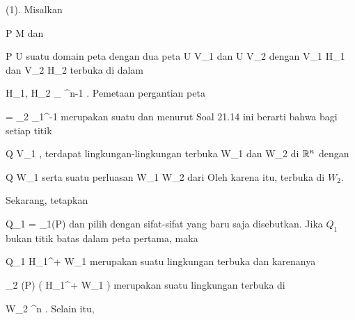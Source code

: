 {

\teilbeweis {}{}{}
{(1). Misalkan

\mavergleichskette
{\vergleichskette
{ P
}
{ \in }{ M
}
{  }{
}
{    }{
}
{   }{
}
}
{}{}{}
dan

\mavergleichskette
{\vergleichskette
{ P
}
{ \in }{ U
}
{  }{
}
{    }{
}
{   }{
}
}
{}{}{}
suatu domain peta dengan dua peta
 { U } { V_1
} {}
dan
 { U } { V_2
} {}
dengan
\mathkor {} {V_1 \subseteq H_1} {dan} {V_2 \subseteq H_2} {}
terbuka di dalam

\mavergleichskette
{\vergleichskette
{ H_1, H_2
}
{ \cong }{ \R_{} \times \R^{n-1}
}
{  }{
}
{    }{
}
{   }{
}
}
{}{}{.}
Pemetaan pergantian peta

\mavergleichskette
{\vergleichskette
{ \varphi
}
{ = }{ \alpha_2 \circ \alpha_1^{-1}
}
{  }{
}
{    }{
}
{   }{
}
}
{}{}{}
merupakan suatu
dan menurut Soal 21.14 ini berarti bahwa bagi setiap titik

\mavergleichskette
{\vergleichskette
{ Q
}
{ \in }{ V_1
}
{  }{
}
{    }{
}
{   }{
}
}
{}{}{,}
terdapat lingkungan-lingkungan terbuka
\mathkor {} {W_1} {dan} {W_2} {}
di ${\mathbb R}^n$ dengan

\mavergleichskette
{\vergleichskette
{ Q
}
{ \in }{ W_1
}
{  }{
}
{    }{
}
{   }{
}
}
{}{}{}
serta suatu perluasan
\maabbdisp {\tilde{\varphi}} {W_1 } { W_2
} {}
dari
 Oleh karena itu,
 terbuka di $W_2$.

Sekarang, tetapkan

\mavergleichskette
{\vergleichskette
{ Q_1
}
{ = }{ \alpha_1(P)
}
{  }{
}
{    }{
}
{   }{
}
}
{}{}{}
dan pilih
 dengan sifat-sifat yang baru saja disebutkan. Jika $Q_1$ bukan titik batas dalam peta pertama, maka

\mavergleichskette
{\vergleichskette
{ Q_1
}
{ \in }{ H_1^+ \cap W_1
}
{  }{
}
{    }{
}
{   }{
}
}
{}{}{}
merupakan suatu lingkungan terbuka dan karenanya

\mavergleichskette
{\vergleichskette
{ \alpha_2 (P)
}
{ \in }{ \tilde{\varphi} \left(  H_1^+ \cap W_1  \right)
}
{  }{
}
{    }{
}
{   }{
}
}
{}{}{}
merupakan suatu lingkungan terbuka di

\mavergleichskette
{\vergleichskette
{ W_2
}
{ \subseteq }{ \R^n
}
{  }{
}
{    }{
}
{   }{
}
}
{}{}{.}
Selain itu,

}}
